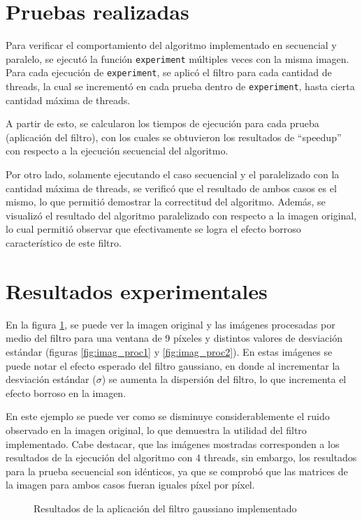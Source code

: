 \documentclass {article}
\begin{document}
\section{Pruebas realizadas}
\label{sec:pruebas}
Para verificar el comportamiento del algoritmo implementado en secuencial y paralelo, se ejecutó la
función \texttt{experiment} múltiples veces con la misma imagen. Para cada ejecución de
\texttt{experiment}, se aplicó el filtro para cada cantidad de threads, la cual se incrementó en
cada prueba dentro de \texttt{experiment}, hasta cierta cantidad máxima de threads.

A partir de esto, se calcularon los tiempos de ejecución para cada prueba (aplicación del filtro),
con los cuales se obtuvieron los resultados de ``speedup'' con respecto a la ejecución secuencial
del algoritmo.

Por otro lado, solamente ejecutando el caso secuencial y el paralelizado con la cantidad máxima de
threads, se verificó que el resultado de ambos casos es el mismo, lo que permitió demostrar la
correctitud del algoritmo. Además, se visualizó el resultado del algoritmo paralelizado con respecto
a la imagen original, lo cual permitió observar que efectivamente se logra el efecto borroso
característico de este filtro.

\section{Resultados experimentales}

En la figura \ref{fig:result_filtro}, se puede ver la imagen original y las imágenes procesadas por
medio del filtro para una ventana de 9 píxeles y distintos valores de desviación estándar (figuras
\ref{fig:imag_proc1} y \ref{fig:imag_proc2}). En estas imágenes se puede notar el efecto esperado
del filtro gaussiano, en donde al incrementar la desviación estándar ($\sigma$) se aumenta la
dispersión del filtro, lo que incrementa el efecto borroso en la imagen.

En este ejemplo se puede ver como se disminuye considerablemente el ruido observado en la imagen
original, lo que demuestra la utilidad del filtro implementado. Cabe destacar, que las imágenes
mostradas corresponden a los resultados de la ejecución del algoritmo con 4 threads, sin embargo,
los resultados para la prueba secuencial son idénticos, ya que se comprobó que las matrices de la
imagen para ambos casos fueran iguales píxel por píxel.

\begin{figure}[H]
  \centering
  \caption{\label{fig:result_filtro}Resultados de la aplicación del filtro gaussiano implementado}
\end{figure}
\end{document}
